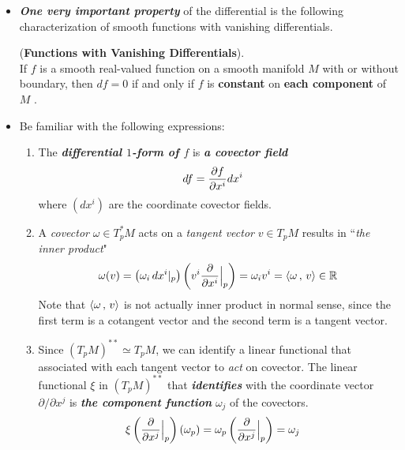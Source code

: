 \documentclass[11pt]{article}
\begin{document}
\begin{itemize}
\item \emph{\textbf{One very important property}} of the differential is the following characterization of smooth functions with vanishing differentials.
\begin{proposition} (\textbf{Functions with Vanishing Differentials}). \citep{lee2003introduction} \\
If $f$ is a smooth real-valued function on a smooth manifold $M$ with or without boundary, then $df = 0$ if and only if $f$ is \textbf{constant} on \textbf{each component} of $M$ .
\end{proposition}

\item \begin{remark} Be familiar with the following expressions:
\begin{enumerate}
\item The \emph{\textbf{differential $1$-form of $f$}} is \emph{\textbf{a covector field}}
\begin{align*}
df &= \frac{\partial f}{ \partial x^i} dx^{i}
\end{align*} where $(dx^i)$ are the coordinate covector fields. 

\item A \emph{covector} $\omega \in T_p^{*}M$ acts on a \emph{tangent vector} $v \in T_pM$ results in ``\emph{the inner product}"
\begin{align*}
\omega(v) =  \left(\omega_i\, dx^{i}|_{p}\right)\left(v^i \frac{\partial }{ \partial x^{i}}\Bigr|_{p}\right) = \omega_i v^i = \left\langle \omega\,,\, v \right\rangle \in {\mathbb R}
\end{align*} Note that $\left\langle \omega\,,\, v \right\rangle$ is not actually inner product in normal sense, since the first term is a cotangent vector and the second term is a tangent vector.


\item Since $(T_pM)^{**} \simeq T_pM$, we can identify a linear functional that associated with each tangent vector to \emph{act} on covector. The linear functional $\xi$ in $(T_pM)^{**}$ that \emph{\textbf{identifies}} with the coordinate vector $\partial / \partial x^{j}$ is \emph{\textbf{the component function}} $\omega_j$ of the covectors.  
\begin{align*}
\xi\left(\frac{\partial }{ \partial x^{j}}\Bigr|_{p}\right)\left(\omega_{p}\right) &= \omega_{p}\left(\frac{\partial }{ \partial x^{j}}\Bigr|_{p}\right) = \omega_{j}
\end{align*} 


\end{enumerate}
\end{remark}
\end{itemize}
\end{document}
